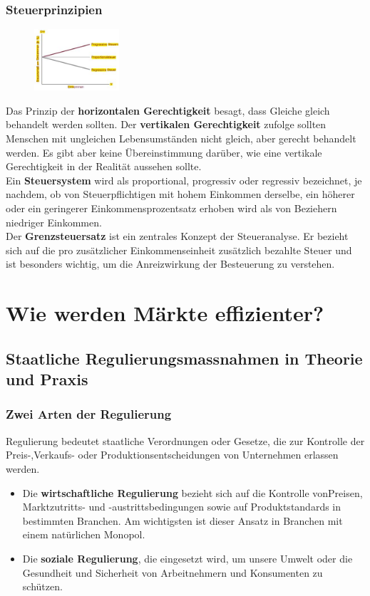 \documentclass[10pt]{scrartcl}
\begin{document}
\subsubsection{Steuerprinzipien}
\begin{figure}
  \begin{center}
  	\vspace{-10pt}
    \includegraphics[width=0.28\textwidth]{img/steuer.jpg}
    \vspace{-10pt}
    \end{center}
\end{figure}
Das Prinzip der {\bf horizontalen Gerechtigkeit} besagt, dass Gleiche gleich behandelt werden sollten. Der {\bf vertikalen Gerechtigkeit} zufolge sollten Menschen mit ungleichen Lebensumständen nicht gleich, aber gerecht behandelt werden. Es gibt aber keine Übereinstimmung darüber, wie eine vertikale Gerechtigkeit in der Realität aussehen sollte.\\
Ein {\bf Steuersystem} wird als proportional, progressiv oder regressiv bezeichnet, je nachdem, ob von Steuerpflichtigen mit hohem Einkommen derselbe, ein höherer oder ein geringerer Einkommensprozentsatz erhoben wird als von Beziehern niedriger Einkommen.\\
Der {\bf Grenzsteuersatz } ist ein zentrales Konzept der Steueranalyse. Er bezieht sich auf die pro zusätzlicher Einkommenseinheit zusätzlich bezahlte Steuer und ist besonders wichtig, um die Anreizwirkung der Besteuerung zu verstehen. 

\section{Wie werden Märkte effizienter?}
\subsection{Staatliche Regulierungsmassnahmen in Theorie und Praxis}
\subsubsection{Zwei Arten der Regulierung}
Regulierung bedeutet staatliche Verordnungen oder Gesetze, die zur Kontrolle der Preis-,Verkaufs- oder Produktionsentscheidungen  von Unternehmen erlassen werden.
\begin{itemize}
\item Die {\bf wirtschaftliche Regulierung } bezieht sich auf die Kontrolle vonPreisen, Marktzutritts- und -austrittsbedingungen sowie auf Produktstandards in bestimmten Branchen. Am wichtigsten ist dieser Ansatz in Branchen mit einem natürlichen Monopol.  
\item Die {\bf soziale Regulierung}, die eingesetzt wird, um unsere Umwelt oder die Gesundheit und Sicherheit von Arbeitnehmern und Konsumenten zu schützen. 
\end{itemize}
\end{document}
